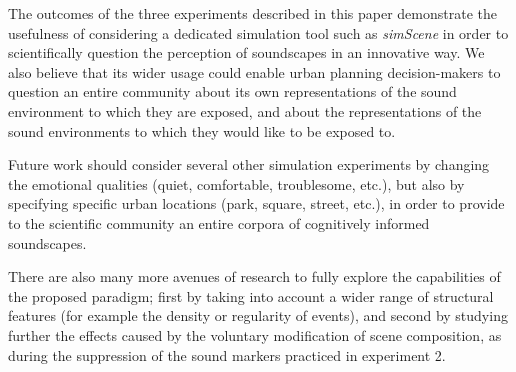 \documentclass[12pt]{elsarticle}
\newcommand{\etc}{\emph{etc.}}
\begin{document}

The outcomes of the three experiments described in this paper demonstrate the usefulness of considering a dedicated simulation tool such as \emph{simScene} in order to scientifically question the perception of soundscapes in an innovative way. We also believe that its wider usage could enable urban planning decision-makers to question an entire community about its own representations of the sound environment to which they are exposed, and about the representations of the sound environments to which they would like to be exposed to.


Future work should consider several other simulation experiments by changing the emotional qualities (quiet, comfortable, troublesome, etc.), but also by specifying specific urban locations (park, square, street, etc.), in order to provide to the scientific community an entire corpora of cognitively informed soundscapes.


There are also many more avenues of research to fully explore the capabilities of the proposed paradigm; first by taking into account a wider range of structural features (for example the density or regularity of events), and second by studying further the effects caused by the voluntary modification of scene composition, as during the suppression of the sound markers practiced in experiment 2.

\end{document}

